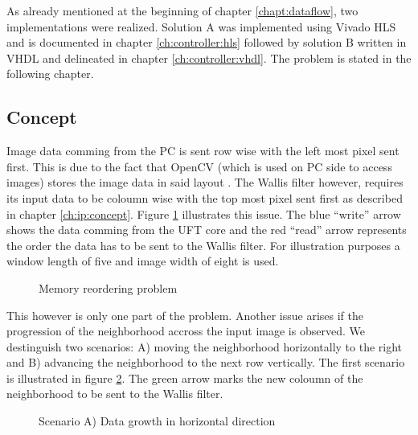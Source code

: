 As already mentioned at the beginning of chapter \ref{chapt:dataflow}, two
implementations were realized. Solution A was implemented using Vivado HLS and
is documented in chapter \ref{ch:controller:hls} followed by solution B written
in VHDL and delineated in chapter \ref{ch:controller:vhdl}. The problem is
stated in the following chapter.

\subsection{Concept} \label{ch:control:concept}
Image data comming from the PC is sent row wise with the left most pixel sent
first. This is due to the fact that OpenCV (which is used on PC side to access
images) stores the image data in said layout \cite{opencv_structures}. The
Wallis filter however, requires its input data to be coloumn wise with the top
most pixel sent first as described in chapter \ref{ch:ip:concept}. Figure 
\ref{fig:memproblem} illustrates this issue. The blue ``write'' arrow shows the data
comming from the UFT core and the red ``read'' arrow represents the order the
data has to be sent to the Wallis filter. For illustration purposes a window
length of five and image width of eight is used.

\begin{figure}[H]
    \centering
    \begin{adjustbox}{scale=0.7}
        
    \end{adjustbox}
    \caption{Memory reordering problem}
    \label{fig:memproblem}
\end{figure}

This however is only one part of the problem. Another issue arises if the
progression of the neighborhood accross the input image is observed. We
destinguish two scenarios: A) moving the neighborhood horizontally to the right
and B) advancing the neighborhood to the next row vertically. The first
scenario is illustrated in figure \ref{fig:memproblemgrowthx}. The green arrow
marks the new coloumn of the neighborhood to be sent to the Wallis filter.

\begin{figure}[H]
    \centering
    \begin{adjustbox}{scale=0.7}
        
    \end{adjustbox}
    \caption{Scenario A) Data growth in horizontal direction}
    \label{fig:memproblemgrowthx}
\end{figure}

